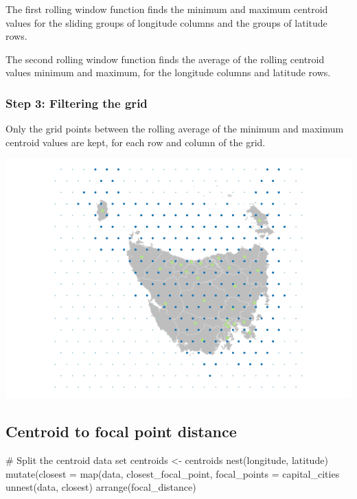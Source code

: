 The first rolling window function finds the minimum and maximum centroid
values for the sliding groups of longitude columns and the groups of
latitude rows.

The second rolling window function finds the average of the rolling
centroid values minimum and maximum, for the longitude columns and
latitude rows.

\hypertarget{step-3-filtering-the-grid}{%
\subsubsection{Step 3: Filtering the
grid}\label{step-3-filtering-the-grid}}

Only the grid points between the rolling average of the minimum and
maximum centroid values are kept, for each row and column of the grid.

\begin{Schunk}

\includegraphics{algorithmRjournal_files/figure-latex/filter_grid-1} \end{Schunk}

\hypertarget{centroid-to-focal-point-distance}{%
\subsection{Centroid to focal point
distance}\label{centroid-to-focal-point-distance}}

\begin{Schunk}
\begin{Sinput}
# Split the centroid data set
centroids <- centroids %
  nest(longitude, latitude) %
  mutate(closest = map(data, closest_focal_point, focal_points = capital_cities %
  unnest(data, closest) %
  arrange(focal_distance)
\end{Sinput}
\end{Schunk}

